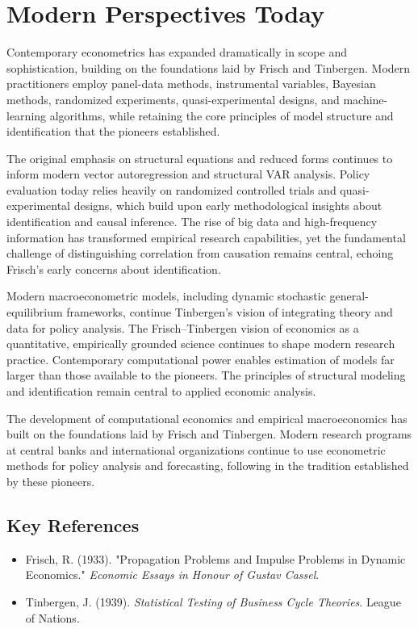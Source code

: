\section{Modern Perspectives Today}
Contemporary econometrics has expanded dramatically in scope and sophistication, building on the
foundations laid by Frisch and Tinbergen. Modern practitioners employ panel-data methods,
instrumental variables, Bayesian methods, randomized experiments, quasi-experimental designs,
and machine-learning algorithms, while retaining the core principles of model structure and
identification that the pioneers established.

The original emphasis on structural equations and reduced forms continues to inform modern vector
autoregression and structural VAR analysis. Policy evaluation today relies heavily on randomized
controlled trials and quasi-experimental designs, which build upon early methodological insights
about identification and causal inference. The rise of big data and high-frequency information
has transformed empirical research capabilities, yet the fundamental challenge of distinguishing
correlation from causation remains central, echoing Frisch's early concerns about identification.

Modern macroeconometric models, including dynamic stochastic general-equilibrium frameworks,
continue Tinbergen's vision of integrating theory and data for policy analysis. The Frisch--Tinbergen
vision of economics as a quantitative, empirically grounded science continues to shape modern
research practice. Contemporary computational power enables estimation of models far larger than
those available to the pioneers. The principles of structural modeling and identification remain
central to applied economic analysis.

The development of computational economics and empirical macroeconomics has built on the
foundations laid by Frisch and Tinbergen. Modern research programs at central banks and
international organizations continue to use econometric methods for policy analysis and
forecasting, following in the tradition established by these pioneers.

\subsection*{Key References}
\begin{itemize}
    \item Frisch, R. (1933). "Propagation Problems and Impulse Problems in Dynamic Economics." \textit{Economic Essays in Honour of Gustav Cassel}.
    \item Tinbergen, J. (1939). \textit{Statistical Testing of Business Cycle Theories}. League of Nations.
\end{itemize}
